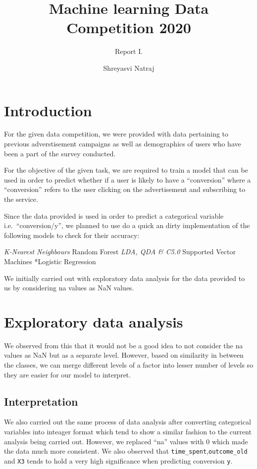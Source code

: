 \documentclass[
]{article}
\title{Machine learning Data Competition 2020}
\subtitle{Report I.}
\author{Shreyasvi Natraj}
\date{}
\begin{document}
\maketitle

\section{Introduction}

For the given data competition, we were provided with data pertaining to
previous adverstisement campaigns as well as demographics of users who
have been a part of the survey conducted.

For the objective of the given task, we are required to train a model
that can be used in order to predict whether if a user is likely to have
a ``conversion'' where a ``conversion'' refers to the user clicking on
the advertisement and subscribing to the service.

Since the data provided is used in order to predict a categorical
variable i.e.~``conversion/y'', we planned to use do a quick an dirty
implementation of the following models to check for their accuracy:

\emph{K-Nearest Neighbours }Random Forest \emph{LDA, QDA \& C5.0
}Supported Vector Machines *Logistic Regression

We initially carried out with exploratory data analysis for the data
provided to us by considering na values as NaN values.

\section{Exploratory data analysis}

We observed from this that it would not be a good idea to not consider
the na values as NaN but as a separate level. However, based on
similarity in between the classes, we can merge different levels of a
factor into lesser number of levels so they are easier for our model to
interpret.

\subsection{Interpretation}

We also carried out the same process of data analysis after converting
categorical variables into inteager format which tend to show a similar
fashion to the current analysis being carried out. However, we replaced
``na'' values with 0 which made the data much more consistent. We also
observed that \texttt{time\_spent},\texttt{outcome\_old} and \texttt{X3}
tends to hold a very high significance when predicting conversion
\texttt{y}.
\end{document}

